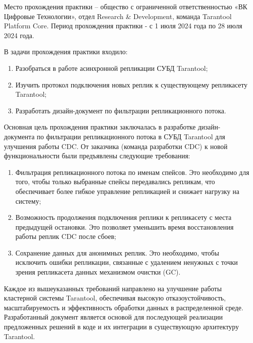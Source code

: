 \introduction

Место прохождения практики – общество с ограниченной ответственностью «ВК Цифровые Технологии», отдел Research \& Development, команда Tarantool Platform Core. Период прохождения практики - с 1 июля 2024 года по 28 июля 2024 года.

В задачи прохождения практики входило:

\begin{enumerate}
    \item Разобраться в работе асинхронной репликации СУБД Tarantool;
    \item Изучить протокол подключения новых реплик к существующему репликасету Tarantool;
    \item Разработать дизайн-документ по фильтрации репликационного потока.
\end{enumerate}

Основная цель прохождения практики заключалась в разработке дизайн-документа по фильтрации репликационного потока в СУБД Tarantool для улучшения работы CDC. От заказчика (команда разработки CDC) к новой функциональности были предъявлены следующие требования:

\begin{enumerate}
    \item Фильтрация репликационного потока по именам спейсов. Это необходимо для того, чтобы только выбранные спейсы передавались репликам, что обеспечивает более гибкое управление репликацией и снижает нагрузку на систему;
    \item Возможность продолжения подключения реплики к репликасету с места предыдущей остановки. Это позволяет уменьшить время восстановления работы реплик CDC после сбоев;
    \item Сохранение данных для анонимных реплик. Это необходимо, чтобы исключить ошибки репликации, связанные с удалением ненужных с точки зрения репликасета данных механизмом очистки (GC).
\end{enumerate}

Каждое из вышеуказанных требований направлено на улучшение работы кластерной системы Tarantool, обеспечивая высокую отказоустойчивость, масштабируемость и эффективность обработки данных в распределенной среде. Разработанный документ является основой для последующей реализации предложенных решений в коде и их интеграции в существующую архитектуру Tarantool.
